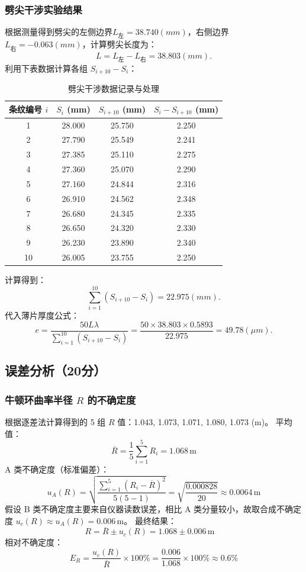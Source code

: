 \documentclass[]{../../templates/Report}%
\begin{document}
\begin{fullreportonly}
\subsubsection{劈尖干涉实验结果}
根据测量得到劈尖的左侧边界$L_{\text{左}}=38.740(mm)$，右侧边界$L_{\text{右}}=-0.063(mm)$，计算劈尖长度为：
\[L=L_{\text{左}}-L_{\text{右}}=38.803(mm).\]
利用下表数据计算各组 $S_{i+10} - S_i$：
\begin{table}[H]
  \centering
  \caption{劈尖干涉数据记录与处理}
  \begin{tabular}{cccc}
    \toprule
    条纹编号 $i$ & $S_i$ (mm) & $S_{i+10}$ (mm) & $S_{i}-S_{i+10}$ (mm) \\
    \midrule
    1 & 28.000 & 25.750 & 2.250 \\
    2 & 27.790 & 25.549 & 2.241 \\
    3 & 27.385 & 25.110 & 2.275 \\
    4 & 27.360 & 25.070 & 2.290 \\
    5 & 27.160 & 24.844 & 2.316 \\
    6 & 26.910 & 24.562 & 2.348 \\
    7 & 26.680 & 24.345 & 2.335 \\
    8 & 26.650 & 24.320 & 2.330 \\
    9 & 26.230 & 23.890 & 2.340 \\
    10 & 26.005 & 23.755 & 2.250 \\
    \bottomrule
  \end{tabular}
\end{table}
计算得到：
\[\sum_{i=1}^{10}(S_{i+10} - S_i) = 22.975(mm).\]
代入薄片厚度公式：
\[e = \frac{50L\lambda}{\sum_{i=1}^{10}(S_{i+10} - S_i)} = \frac{50 \times 38.803 \times 0.5893}{22.975} = 49.78 (\mu m).\]

\subsection{误差分析（20分）}

\subsubsection{牛顿环曲率半径 $R$ 的不确定度}
根据逐差法计算得到的 5 组 $R$ 值：1.043, 1.073, 1.071, 1.080, 1.073 (m)。
平均值：
\[ \overline{R} = \frac{1}{5}\sum_{i=1}^5 R_i = 1.068 \, \text{m} \]
A 类不确定度（标准偏差）：
\[ u_A(R) = \sqrt{\frac{\sum_{i=1}^5 (R_i - \overline{R})^2}{5(5-1)}} = \sqrt{\frac{0.000828}{20}} \approx 0.0064 \, \text{m} \]
假设 B 类不确定度主要来自仪器读数误差，相比 A 类分量较小，故取合成不确定度 $u_c(R) \approx u_A(R) = 0.006 \, \text{m}$。
最终结果：
\[ R = \overline{R} \pm u_c(R) = 1.068 \pm 0.006 \, \text{m} \quad \]
相对不确定度：
\[ E_R = \frac{u_c(R)}{\overline{R}} \times 100\% = \frac{0.006}{1.068} \times 100\% \approx 0.6\% \]


\end{fullreportonly}
\end{document}
